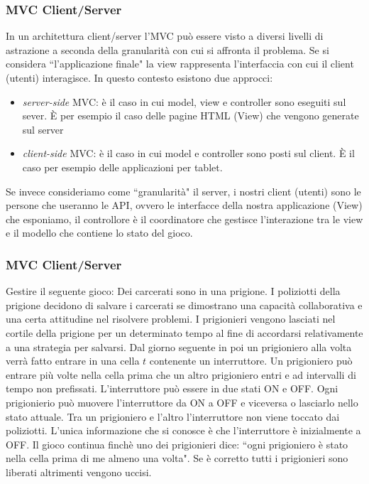 \documentclass{beamer}
\begin{document}
\begin{frame}
\frametitle{MVC Client/Server}
In un architettura client/server l'MVC pu\`o essere visto a diversi livelli di astrazione a seconda della granularit\`a con cui si affronta il problema. Se si considera ``l'applicazione finale" la view rappresenta l'interfaccia con cui il client (utenti) interagisce. In questo contesto esistono due approcci:
\begin{itemize}
\item \emph{server-side} MVC: \`e il caso in cui model, view e controller sono eseguiti sul sever. \`E per esempio il caso delle pagine HTML (View)
che vengono generate sul server
\item \emph{client-side} MVC: \`e il caso in cui model e controller sono posti sul client. \`E il caso per esempio delle applicazioni per tablet.
\end{itemize}

Se invece consideriamo come ``granularit\`a" il server, i nostri client (utenti) sono le persone che useranno le API, ovvero le interfacce della nostra applicazione (View) che esponiamo, il controllore \`e il coordinatore che gestisce l'interazione tra le view e il modello che contiene lo stato del gioco. 
\end{frame}

\begin{frame}
\frametitle{MVC Client/Server}
Gestire il seguente gioco:
Dei carcerati sono in una prigione. I poliziotti della prigione decidono di salvare i carcerati se dimostrano una capacit\`a collaborativa e una certa attitudine nel risolvere problemi. I prigionieri vengono lasciati nel cortile della prigione per un determinato tempo al fine di accordarsi relativamente a una strategia per salvarsi. Dal giorno seguente in poi un prigioniero alla volta verr\`a fatto entrare in una cella $t$ contenente un interruttore.
Un prigioniero pu\`o  entrare pi\`u volte nella cella prima che un altro prigioniero entri e ad intervalli di tempo non prefissati. L'interruttore pu\`o essere in due stati ON e OFF. Ogni prigionierio pu\`o muovere l'interruttore da ON a OFF e viceversa o lasciarlo nello stato  attuale. Tra un prigioniero e l'altro l'interruttore non viene toccato dai poliziotti. L'unica informazione che si conosce \`e che l'interruttore \`e inizialmente a OFF. Il gioco continua finch\`e uno dei prigionieri dice: ``ogni prigioniero \`e stato nella cella prima di me almeno una volta". Se \`e corretto tutti i prigionieri sono liberati altrimenti vengono uccisi.
\end{frame}



\end{document}
